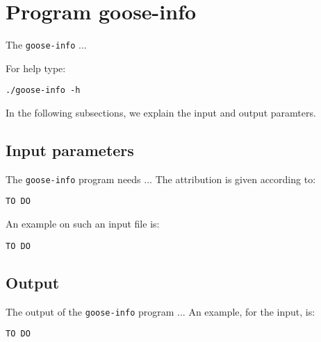 \section{Program goose-info}
The \texttt{goose-info} ...

For help type:
\begin{lstlisting}
./goose-info -h
\end{lstlisting}
In the following subsections, we explain the input and output paramters.

\subsection{Input parameters}

The \texttt{goose-info} program needs ...
The attribution is given according to:
\begin{lstlisting}
TO DO
\end{lstlisting}

An example on such an input file is:
\begin{lstlisting}
TO DO
\end{lstlisting}

\subsection{Output}
The output of the \texttt{goose-info} program ...
An example, for the input, is:
\begin{lstlisting}
TO DO
\end{lstlisting}
